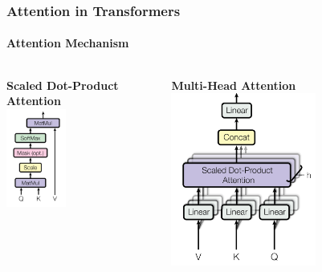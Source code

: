 \documentclass{beamer}
\begin{document}
    \begin{frame}
        \frametitle{Attention in Transformers}
        \framesubtitle{Attention Mechanism}
    
        \begin{columns}[T]
            \begin{column}{0.4\textwidth}
                \textbf{Scaled Dot-Product Attention}\\
                \centering
                \includegraphics[width=0.4\textwidth]{images/scaled_attention.png}
                \vspace{0.5cm}
                \begin{center}
                    \begin{minipage}{\linewidth} %
                        \tiny %
                    \end{minipage}
                \end{center}
            \end{column}
            \begin{column}{.4\textwidth}
                \centering
                \textbf{Multi-Head Attention}\\
                \includegraphics[width=0.6\textwidth]{images/multihead_attention.png}

\end{column}
\end{columns}
\end{frame}
\end{document}
